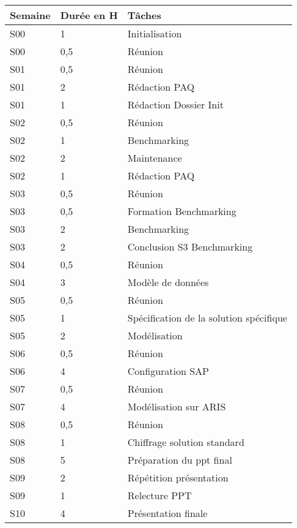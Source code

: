 \begin{tabular}{|l|l|l|}
\hline
Semaine&Durée en H&Tâches\\
\hline
S00&1&Initialisation\\
\hline
S00&0,5&Réunion\\
\hline
S01&0,5&Réunion\\
\hline
S01&2&Rédaction PAQ\\
\hline
S01&1&Rédaction Dossier Init\\
\hline
S02&0,5&Réunion\\
\hline
S02&1&Benchmarking\\
\hline
S02&2&Maintenance\\
\hline
S02&1&Rédaction PAQ\\
\hline
S03&0,5&Réunion\\
\hline
S03&0,5&Formation Benchmarking\\
\hline
S03&2&Benchmarking\\
\hline
S03&2&Conclusion S3 Benchmarking\\
\hline
S04&0,5&Réunion\\
\hline
S04&3&Modèle de données\\
\hline
S05&0,5&Réunion\\
\hline
S05&1&Spécification de la solution spécifique\\
\hline
S05&2&Modélisation\\
\hline
S06&0,5&Réunion\\
\hline
S06&4&Configuration SAP\\
\hline
S07&0,5&Réunion\\
\hline
S07&4&Modélisation sur ARIS\\
\hline
S08&0,5&Réunion\\
\hline
S08&1&Chiffrage solution standard\\
\hline
S08&5&Préparation du ppt final\\
\hline
S09&2&Répétition présentation\\
\hline
S09&1&Relecture PPT\\
\hline
S10&4&Présentation finale\\
\hline
\end{tabular}


